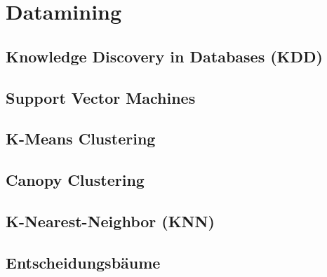 \section{Datamining}

%


\subsection{Knowledge Discovery in Databases (KDD)}

\subsection{Support Vector Machines}

\subsection{K-Means Clustering}

\subsection{Canopy Clustering}

\subsection{K-Nearest-Neighbor (KNN)}

\subsection{Entscheidungsbäume}